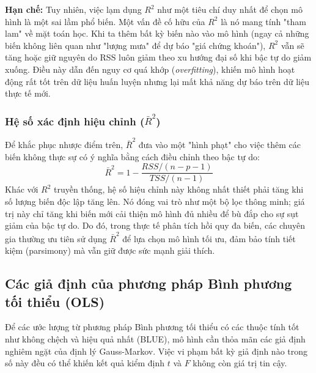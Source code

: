\textbf{Hạn chế:} Tuy nhiên, việc lạm dụng $R^2$ như một tiêu chí duy nhất để chọn mô hình là một sai lầm phổ biến. Một vấn đề cố hữu của $R^2$ là nó mang tính "tham lam" về mặt toán học. Khi ta thêm bất kỳ biến nào vào mô hình (ngay cả những biến không liên quan như "lượng mưa" để dự báo "giá chứng khoán"), $R^2$ vẫn sẽ tăng hoặc giữ nguyên do RSS luôn giảm theo xu hướng đại số khi bậc tự do giảm xuống. Điều này dẫn đến nguy cơ quá khớp (\textit{overfitting}), khiến mô hình hoạt động rất tốt trên dữ liệu huấn luyện nhưng lại mất khả năng dự báo trên dữ liệu thực tế mới.

\subsubsection{Hệ số xác định hiệu chỉnh ($\bar{R}^2$)}
Để khắc phục nhược điểm trên, $\bar{R}^2$ đưa vào một "hình phạt" cho việc thêm các biến không thực sự có ý nghĩa bằng cách điều chỉnh theo bậc tự do:
\begin{equation}
\bar{R}^2 = 1 - \frac{RSS/(n - p - 1)}{TSS/(n - 1)}
\end{equation}
Khác với $R^2$ truyền thống, hệ số hiệu chỉnh này không nhất thiết phải tăng khi số lượng biến độc lập tăng lên. Nó đóng vai trò như một bộ lọc thông minh; giá trị này chỉ tăng khi biến mới cải thiện mô hình đủ nhiều để bù đắp cho sự sụt giảm của bậc tự do. Do đó, trong thực tế phân tích hồi quy đa biến, các chuyên gia thường ưu tiên sử dụng $\bar{R}^2$ để lựa chọn mô hình tối ưu, đảm bảo tính tiết kiệm (parsimony) mà vẫn giữ được sức mạnh giải thích.

\subsection{Các giả định của phương pháp Bình phương tối thiểu (OLS)}
Để các ước lượng từ phương pháp Bình phương tối thiểu có các thuộc tính tốt như không chệch và hiệu quả nhất (BLUE), mô hình cần thỏa mãn các giả định nghiêm ngặt của định lý Gauss-Markov. Việc vi phạm bất kỳ giả định nào trong số này đều có thể khiến kết quả kiểm định $t$ và $F$ không còn giá trị tin cậy.

